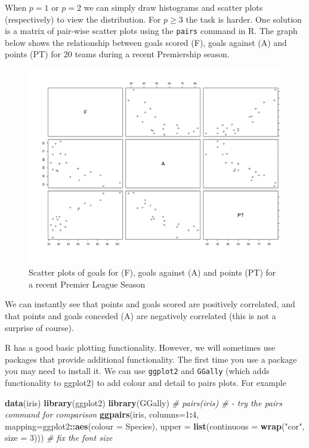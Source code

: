 \documentclass[]{book}
\newenvironment{Shaded}{\begin{snugshade}}{\end{snugshade}}
\newcommand{\CommentTok}[1]{\textcolor[rgb]{0.56,0.35,0.01}{\textit{#1}}}
\newcommand{\DataTypeTok}[1]{\textcolor[rgb]{0.13,0.29,0.53}{#1}}
\newcommand{\DecValTok}[1]{\textcolor[rgb]{0.00,0.00,0.81}{#1}}
\newcommand{\KeywordTok}[1]{\textcolor[rgb]{0.13,0.29,0.53}{\textbf{#1}}}
\newcommand{\NormalTok}[1]{#1}
\newcommand{\OperatorTok}[1]{\textcolor[rgb]{0.81,0.36,0.00}{\textbf{#1}}}
\newcommand{\StringTok}[1]{\textcolor[rgb]{0.31,0.60,0.02}{#1}}
\theoremstyle{definition}
\theoremstyle{definition}
\theoremstyle{definition}
\theoremstyle{remark}
\begin{document}
When \(p=1\) or \(p=2\) we can simply draw histograms and scatter plots (respectively) to view the distribution. For \(p \geq 3\) the task is harder. One solution is a matrix of pair-wise scatter plots using the \texttt{pairs} command in R. The graph below shows the relationship between goals scored (F), goals against (A) and points (PT) for 20 teams during a recent Premiership season.

\begin{figure}
\includegraphics[width=30.56in]{figs/pairs} \caption{Scatter plots of goals for (F), goals against (A) and points (PT) for a recent Premier League Season}\label{fig:unnamed-chunk-6}
\end{figure}

We can instantly see that points and goals scored are positively correlated, and that points and goals conceded (A) are negatively correlated (this is not a surprise of course).

R has a good basic plotting functionality. However, we will sometimes use packages that provide additional functionality. The first time you use a package you may need to install it. We can use \texttt{ggplot2} and \texttt{GGally} (which adds functionality to ggplot2) to add colour and detail to pairs plots. For example

\begin{Shaded}
\begin{Highlighting}[]
\KeywordTok{data}\NormalTok{(iris)}
\KeywordTok{library}\NormalTok{(ggplot2)}
\KeywordTok{library}\NormalTok{(GGally)}
\CommentTok{# pairs(iris) # - try the pairs command for comparison}
\KeywordTok{ggpairs}\NormalTok{(iris, }\DataTypeTok{columns=}\DecValTok{1}\OperatorTok{:}\DecValTok{4}\NormalTok{,  }\DataTypeTok{mapping=}\NormalTok{ggplot2}\OperatorTok{::}\KeywordTok{aes}\NormalTok{(}\DataTypeTok{colour =}\NormalTok{ Species),}
        \DataTypeTok{upper =} \KeywordTok{list}\NormalTok{(}\DataTypeTok{continuous =} \KeywordTok{wrap}\NormalTok{(}\StringTok{"cor"}\NormalTok{, }\DataTypeTok{size =} \DecValTok{3}\NormalTok{)))  }\CommentTok{# fix the font size}
\end{Highlighting}
\end{Shaded}
\end{document}
